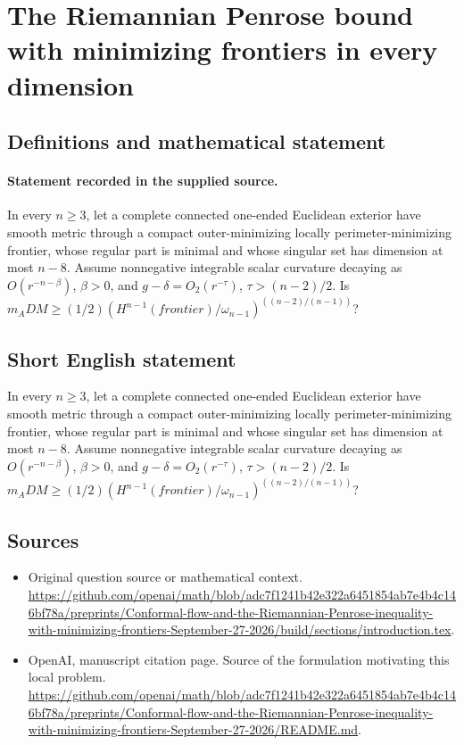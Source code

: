 \documentclass[11pt]{article}
\begin{document}
\section*{The Riemannian Penrose bound with minimizing frontiers in every dimension}\label{30007245}
\subsection{Definitions and mathematical statement}
\paragraph{Statement recorded in the supplied source.}
In every $n\geq 3$, let a complete connected one-ended Euclidean exterior have smooth metric through a compact outer-minimizing locally perimeter-minimizing frontier, whose regular part is minimal and whose singular set has dimension at most $n-8$. Assume nonnegative integrable scalar curvature decaying as $O(r^{-n-\beta })$, $\beta >0$, and $g-\delta =O_2(r^{-\tau })$, $\tau >(n-2)/2$. Is $m_ADM\geq (1/2)(H^{n-1}(frontier)/\omega _{n-1})^((n-2)/(n-1))$?
\subsection{Short English statement}
In every $n\geq 3$, let a complete connected one-ended Euclidean exterior have smooth metric through a compact outer-minimizing locally perimeter-minimizing frontier, whose regular part is minimal and whose singular set has dimension at most $n-8$. Assume nonnegative integrable scalar curvature decaying as $O(r^{-n-\beta })$, $\beta >0$, and $g-\delta =O_2(r^{-\tau })$, $\tau >(n-2)/2$. Is $m_ADM\geq (1/2)(H^{n-1}(frontier)/\omega _{n-1})^((n-2)/(n-1))$?
\subsection{Sources}
\begin{itemize}
\item[S1] Original question source or mathematical context.
\url{https://github.com/openai/math/blob/adc7f1241b42e322a6451854ab7e4b4c146bf78a/preprints/Conformal-flow-and-the-Riemannian-Penrose-inequality-with-minimizing-frontiers-September-27-2026/build/sections/introduction.tex}.
\item[S2] OpenAI, manuscript citation page. Source of the formulation motivating this local problem.
\url{https://github.com/openai/math/blob/adc7f1241b42e322a6451854ab7e4b4c146bf78a/preprints/Conformal-flow-and-the-Riemannian-Penrose-inequality-with-minimizing-frontiers-September-27-2026/README.md}.
\end{itemize}
\end{document}
